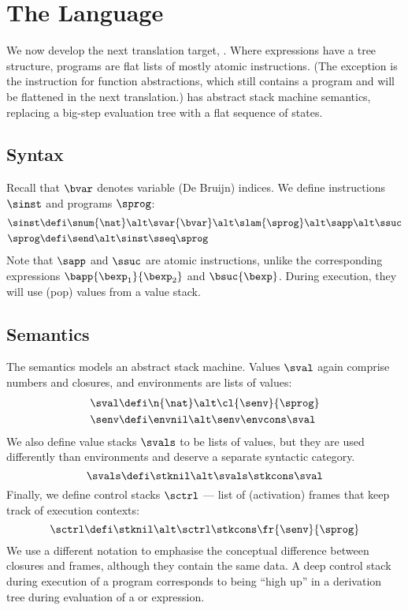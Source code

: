 \section{The \textnormal{\slang} Language}

We now develop the next translation target, \slang.
Where \blang expressions have a tree structure, \slang programs are flat lists of mostly atomic instructions.
(The exception is the instruction for function abstractions, which still contains a program and will be flattened in the next translation.)
\slang has abstract stack machine semantics, replacing a big-step evaluation tree with a flat sequence of states.


\subsection{Syntax}

Recall that $\bvar$ denotes variable (De Bruijn) indices.
We define \slang instructions $\sinst$ and programs $\sprog$:
\begin{align*}
  \sinst &\defi \snum{\nat} \alt \svar{\bvar} \alt \slam{\sprog} \alt \sapp \alt \ssuc \\
  \sprog &\defi \send \alt \sinst \sseq \sprog
\end{align*}
Note that $\sapp$ and $\ssuc$ are atomic instructions, unlike the corresponding \blang expressions $\bapp{\bexp_1}{\bexp_2}$ and $\bsuc{\bexp}$.
During execution, they will use (pop) values from a value stack.


\subsection{Semantics}

The semantics models an abstract stack machine.
Values $\sval$ again comprise numbers and closures, and environments are lists of values:
\begin{align*}
  \sval &\defi \n{\nat} \alt \cl{\senv}{\sprog} \\
  \senv &\defi \envnil \alt \senv \envcons \sval
\end{align*}
We also define value stacks $\svals$ to be lists of values, but they are used differently than environments and deserve a separate syntactic category.
\[
\svals \defi \stknil \alt \svals \stkcons \sval
\]
Finally, we define control stacks $\sctrl$ --- list of (activation) frames that keep track of execution contexts:
\[
\sctrl \defi \stknil \alt \sctrl \stkcons \fr{\senv}{\sprog}
\]
We use a different notation to emphasise the conceptual difference between closures and frames, although they contain the same data.
A deep control stack during execution of a \slang program corresponds to being ``high up'' in a derivation tree during evaluation of a \hlang or \blang expression.

